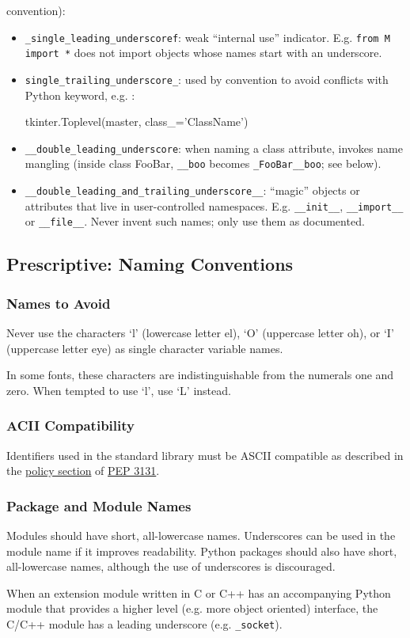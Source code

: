 \documentclass[a4paper,11pt]{article}
\begin{document}
convention):
\begin{itemize}
\item \verb"_single_leading_underscoref": weak “internal use” indicator. E.g. 
\verb"from M import *" does not import objects whose names start with an 
underscore.
\item \verb"single_trailing_underscore_": used by convention to avoid 
conflicts with Python keyword, e.g. :
\begin{python}
tkinter.Toplevel(master, class_='ClassName')
\end{python}
\item \verb"__double_leading_underscore": when naming a class attribute, 
invokes name mangling (inside class FooBar, \verb"__boo" becomes 
\verb"_FooBar__boo"; see below).
\item \verb"__double_leading_and_trailing_underscore__": “magic” objects or 
attributes that live in user-controlled namespaces. E.g. \verb"__init__", 
\verb"__import__" or \verb"__file__". Never invent such names; only use them 
as documented.
\end{itemize}
\subsection{Prescriptive: Naming Conventions}
\subsubsection{Names to Avoid}
Never use the characters ‘l’ (lowercase letter el), ‘O’ (uppercase letter 
oh), or ‘I’ (uppercase letter eye) as single character variable names.
\par
In some fonts, these characters are indistinguishable from the numerals one 
and zero. When tempted to use ‘l’, use ‘L’ instead.
\subsubsection{ACII Compatibility}
Identifiers used in the standard library must be ASCII compatible as described
in the
\href{https://peps.python.org/pep-3131/#policy-specification}{policy section} of
\href{https://peps.python.org/pep-3131/}{PEP 3131}.
\subsubsection{Package and Module Names}
Modules should have short, all-lowercase names. Underscores can be used in 
the module name if it improves readability. Python packages should also have 
short, all-lowercase names, although the use of underscores is discouraged.
\par
When an extension module written in C or C++ has an accompanying Python 
module that provides a higher level (e.g. more object oriented) interface, 
the C/C++ module has a leading underscore (e.g. \verb"_socket").
\end{document}
